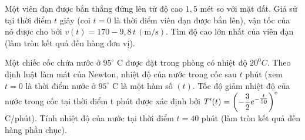 \begin{ex}%
Một viên đạn được bắn thẳng đứng lên từ độ cao $1{,}5$ mét so với mặt đất. Giả sử tại thời điểm $t$ giây (coi $t=0$ là thời điểm viên đạn được bắn lên), vận tốc của nó được cho bởi $v(t)=170-9{,}8\,t\,\left( \text{m/s} \right)$. Tìm độ cao lớn nhất của viên đạn (làm tròn kết quả đến hàng đơn vị).
\end{ex} 
\begin{ex}%
Một chiếc cốc chứa nước ở $95^\circ$ C được đặt trong phòng có nhiệt độ ${{20}^{0}}C$. Theo định luật làm mát của Newton, nhiệt độ của nước trong cốc sau $t$ phút (xem $t=0$ là thời điểm nước ở $95^\circ$ C là một hàm số $(t)$. Tốc độ giảm nhiệt độ của nước trong cốc tại thời điểm t phút được xác định bởi $T'(t)=\left(-\dfrac{3}{2} \mathrm\mathrm{e}^{-\tfrac{t}{50}}\right)^\circ$ C/phút). Tính nhiệt độ của nước tại thời điểm $t=40$ phút (làm tròn kết quả đến hàng phần chục).
\end{ex} 
